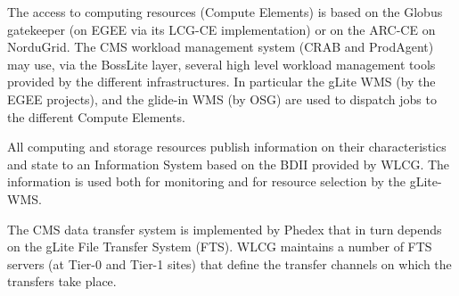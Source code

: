 The access to computing resources (Compute Elements) is based on
the Globus gatekeeper (on EGEE via its LCG-CE implementation) or on the ARC-CE on NorduGrid.
The CMS workload management system (CRAB and ProdAgent) may use, via the BossLite layer,
several high level workload management tools provided by the different infrastructures.
In particular the gLite WMS (by the EGEE projects), and the glide-in WMS (by OSG)
are used to dispatch jobs to the different Compute Elements.

All computing and storage resources publish information on their
characteristics and state to an Information System based
on the BDII provided by WLCG. The information is used both
for monitoring and for resource selection by the gLite-WMS.

The CMS data transfer system is implemented by Phedex that
in turn depends on the gLite File Transfer System (FTS).
WLCG maintains a number of FTS servers (at Tier-0 and Tier-1 sites)
that define the transfer channels on which the transfers take place.


